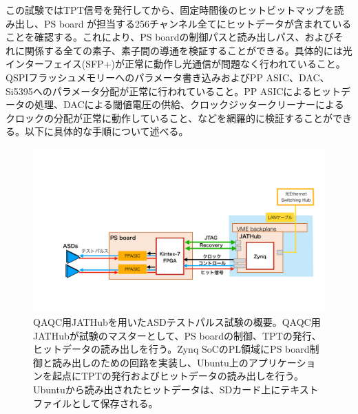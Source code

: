 この試験ではTPT信号を発行してから、固定時間後のヒットビットマップを読み出し、PS board が担当する256チャンネル全てにヒットデータが含まれていることを確認する。これにより、PS boardの制御パスと読み出しパス、およびそれに関係する全ての素子、素子間の導通を検証することができる。具体的には光インターフェイス(SFP+)が正常に動作し光通信が問題なく行われていること。QSPIフラッシュメモリーへのパラメータ書き込みおよびPP ASIC、DAC、Si5395へのパラメータ分配が正常に行われていること。PP ASICによるヒットデータの処理、DACによる閾値電圧の供給、クロックジッタークリーナーによるクロックの分配が正常に動作していること、などを網羅的に検証することができる。以下に具体的な手順について述べる。


\begin{figure} 
\centering
\includegraphics[width=16cm]{fig/QAQC/QAQCasdtp.pdf}
\caption[QAQC用JATHubを用いたASDテストパルス試験]{QAQC用JATHubを用いたASDテストパルス試験の概要。QAQC用JATHubが試験のマスターとして、PS boardの制御、TPTの発行、ヒットデータの読み出しを行う。Zynq SoCのPL領域にPS board制御と読み出しのための回路を実装し、Ubuntu上のアプリケーションを起点にTPTの発行およびヒットデータの読み出しを行う。Ubuntuから読み出されたヒットデータは、SDカード上にテキストファイルとして保存される。}
\label{QAQCasdtp}
\end{figure}

